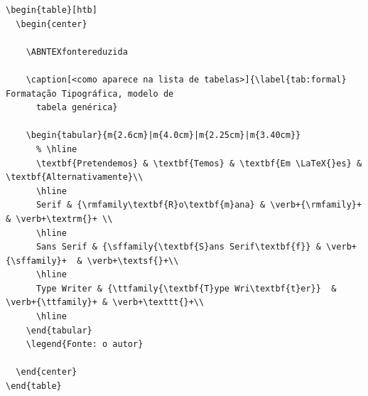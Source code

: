\documentclass[11pt]{article}
\begin{document}
\begin{verbatim}
\begin{table}[htb]
  \begin{center}

    \ABNTEXfontereduzida

    \caption[<como aparece na lista de tabelas>]{\label{tab:formal} Formatação Tipográfica, modelo de
      tabela genérica}

    \begin{tabular}{m{2.6cm}|m{4.0cm}|m{2.25cm}|m{3.40cm}}
      % \hline
      \textbf{Pretendemos} & \textbf{Temos} & \textbf{Em \LaTeX{}es} & \textbf{Alternativamente}\\
      \hline
      Serif & {\rmfamily\textbf{R}o\textbf{m}ana} & \verb+{\rmfamily}+  & \verb+\textrm{}+ \\
      \hline
      Sans Serif & {\sffamily{\textbf{S}ans Serif\textbf{f}} & \verb+{\sffamily}+  & \verb+\textsf{}+\\
      \hline
      Type Writer & {\ttfamily{\textbf{T}ype Wri\textbf{t}er}}  & \verb+{\ttfamily}+ & \verb+\texttt{}+\\
      \hline
    \end{tabular}
    \legend{Fonte: o autor}

  \end{center}
\end{table}
\end{verbatim}
\end{document}
